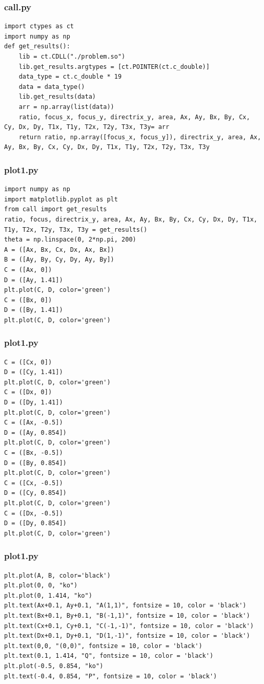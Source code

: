 \documentclass{beamer}
\begin{document}
\begin{frame}[fragile]
    \frametitle{call.py}
    \begin{lstlisting}
import ctypes as ct
import numpy as np
def get_results():
    lib = ct.CDLL("./problem.so")
    lib.get_results.argtypes = [ct.POINTER(ct.c_double)]
    data_type = ct.c_double * 19
    data = data_type()
    lib.get_results(data)
    arr = np.array(list(data))
    ratio, focus_x, focus_y, directrix_y, area, Ax, Ay, Bx, By, Cx, Cy, Dx, Dy, T1x, T1y, T2x, T2y, T3x, T3y= arr
    return ratio, np.array([focus_x, focus_y]), directrix_y, area, Ax, Ay, Bx, By, Cx, Cy, Dx, Dy, T1x, T1y, T2x, T2y, T3x, T3y
    \end{lstlisting}
\end{frame}

\begin{frame}[fragile]
    \frametitle{plot1.py}
    \begin{lstlisting}
import numpy as np
import matplotlib.pyplot as plt
from call import get_results
ratio, focus, directrix_y, area, Ax, Ay, Bx, By, Cx, Cy, Dx, Dy, T1x, T1y, T2x, T2y, T3x, T3y = get_results()
theta = np.linspace(0, 2*np.pi, 200)
A = ([Ax, Bx, Cx, Dx, Ax, Bx])
B = ([Ay, By, Cy, Dy, Ay, By])
C = ([Ax, 0])
D = ([Ay, 1.41])
plt.plot(C, D, color='green')
C = ([Bx, 0])
D = ([By, 1.41])
plt.plot(C, D, color='green')
    \end{lstlisting}
\end{frame}

\begin{frame}[fragile]
    \frametitle{plot1.py}
    \begin{lstlisting}
C = ([Cx, 0])
D = ([Cy, 1.41])
plt.plot(C, D, color='green')
C = ([Dx, 0])
D = ([Dy, 1.41])
plt.plot(C, D, color='green')
C = ([Ax, -0.5])
D = ([Ay, 0.854])
plt.plot(C, D, color='green')
C = ([Bx, -0.5])
D = ([By, 0.854])
plt.plot(C, D, color='green')
C = ([Cx, -0.5])
D = ([Cy, 0.854])
plt.plot(C, D, color='green')
C = ([Dx, -0.5])
D = ([Dy, 0.854])
plt.plot(C, D, color='green')
    \end{lstlisting}
\end{frame}

\begin{frame}[fragile]
    \frametitle{plot1.py}
    \begin{lstlisting}
plt.plot(A, B, color='black')
plt.plot(0, 0, "ko")
plt.plot(0, 1.414, "ko")
plt.text(Ax+0.1, Ay+0.1, "A(1,1)", fontsize = 10, color = 'black')
plt.text(Bx+0.1, By+0.1, "B(-1,1)", fontsize = 10, color = 'black')
plt.text(Cx+0.1, Cy+0.1, "C(-1,-1)", fontsize = 10, color = 'black')
plt.text(Dx+0.1, Dy+0.1, "D(1,-1)", fontsize = 10, color = 'black')
plt.text(0,0, "(0,0)", fontsize = 10, color = 'black')
plt.text(0.1, 1.414, "Q", fontsize = 10, color = 'black')
plt.plot(-0.5, 0.854, "ko")
plt.text(-0.4, 0.854, "P", fontsize = 10, color = 'black')
    \end{lstlisting}
\end{frame}
\end{document}
